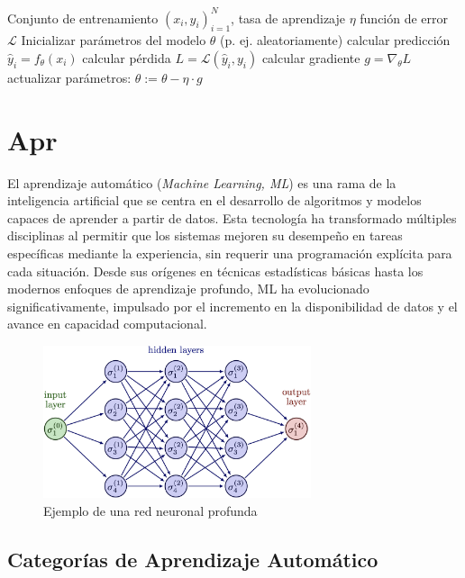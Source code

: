 \documentclass[11pt,spanish,listoffigures,listoftables]{tfgetsinf}
\begin{document}
\begin{algorithmic}
    \label{alg:gd-train}
    \REQUIRE Conjunto de entrenamiento ${(x_i, y_i)}_{i=1}^N$, tasa de aprendizaje $\eta$ función de error $\mathcal{L}$
    \STATE Inicializar parámetros del modelo $\theta$ (p. ej. aleatoriamente)
            \STATE calcular predicción $\hat{y}_i = f_\theta(x_i)$
            \STATE calcular pérdida $L = \mathcal{L}(\hat{y}_i, y_i)$ 
            \STATE calcular gradiente $g = \nabla_{\theta} L$
            \STATE actualizar parámetros: $\theta := \theta - \eta \cdot g$
        \ENDFOR
    \ENDFOR
\end{algorithmic}

\section{Apr}

El aprendizaje automático (\textit{Machine Learning, ML}) es una rama de la inteligencia artificial que se centra en el 
desarrollo de algoritmos y modelos capaces de aprender a partir de datos. Esta tecnología ha transformado múltiples 
disciplinas al permitir que los sistemas mejoren su desempeño en tareas específicas mediante la experiencia, sin requerir 
una programación explícita para cada situación. Desde sus orígenes en técnicas estadísticas básicas hasta los modernos 
enfoques de aprendizaje profundo, ML ha evolucionado significativamente, impulsado por el incremento en la disponibilidad 
de datos y el avance en capacidad computacional. 

\begin{figure}[htbp]
    \centering
    \includegraphics[width=0.7\textwidth]{neural_network.jpg}
    \caption{Ejemplo de una red neuronal profunda \cite{neural_network}}
    \label{fig:mi_imagen}
  \end{figure}
\subsection{Categorías de Aprendizaje Automático}
\end{document}
